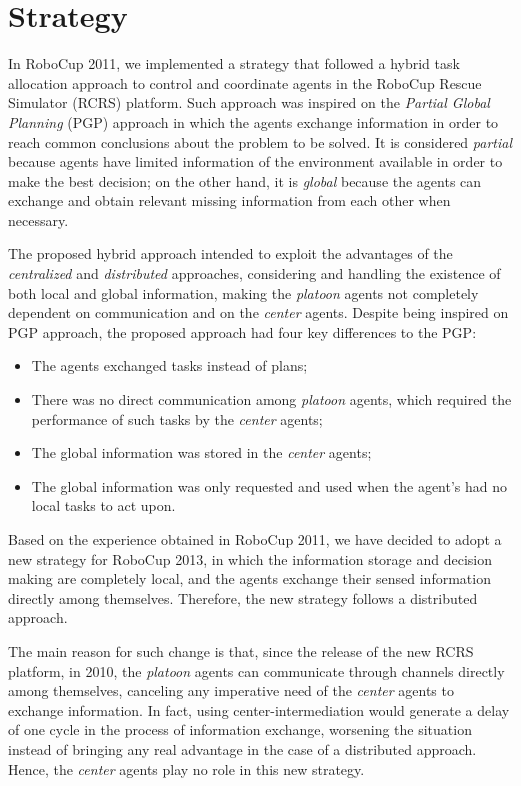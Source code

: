 \documentclass{llncs}
\begin{document}
\section{Strategy}
\label{sec:strategy}
In RoboCup 2011, we implemented a strategy that followed a hybrid task allocation approach \cite{pereiraEtAl2011-robocup} to control and coordinate agents in the RoboCup Rescue Simulator (RCRS) platform. Such approach was inspired on the \textit{Partial Global Planning} (PGP) approach \cite{durfeeLesser1991} in which the agents exchange information in order to reach common conclusions about the problem to be solved. It is considered {\it partial} because agents have limited information of the environment available in order to make the best decision; on the other hand, it is {\it global} because the agents can exchange and obtain relevant missing information from each other when necessary.

The proposed hybrid approach intended to exploit the advantages of the {\it centralized} and {\it distributed} approaches, considering and handling the existence of both local and global information, making the {\it platoon} agents not completely dependent on communication and on the {\it center} agents. Despite being inspired on PGP approach, the proposed approach had four key differences to the PGP:
\begin{itemize}
\item The agents exchanged tasks instead of plans;
\item There was no direct communication among {\it platoon} agents, which required the performance of such tasks by the {\it center} agents;
\item The global information was stored in the {\it center} agents;
\item The global information was only requested and used when the agent's had no local tasks to act upon.
\end{itemize}

Based on the experience obtained in RoboCup 2011, we have decided to adopt a new strategy for RoboCup 2013, in which the information storage and decision making are completely local, and the agents exchange their sensed information directly among themselves. Therefore, the new strategy follows a distributed approach.

The main reason for such change is that, since the release of the new RCRS platform, in 2010, the {\it platoon} agents can communicate through channels directly among themselves, canceling any imperative need of the {\it center} agents to exchange information. In fact, using center-intermediation would generate a delay of one cycle in the process of information exchange, worsening the situation instead of bringing any real advantage in the case of a distributed approach. Hence, the {\it center} agents play no role in this new strategy.
\end{document}
